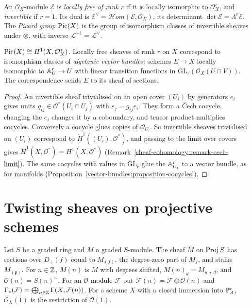 \begin{definition}\label{coherent-sheaves:definition-locally-free}
An $\mathcal{O}_X$-module $\mathcal{E}$ is \emph{locally free of rank $r$} if it is locally isomorphic to $\mathcal{O}_X^r$, and \emph{invertible} if $r = 1$. Its
dual is $\mathcal{E}^\vee = \mathcal{H}om(\mathcal{E}, \mathcal{O}_X)$, its determinant $\det\mathcal{E} = \Lambda^r\mathcal{E}$. The \emph{Picard group} $\operatorname{Pic}(X)$ is
the group of isomorphism classes of invertible sheaves under $\otimes$, with inverse $\mathcal{L}^{-1} = \mathcal{L}^\vee$.
\end{definition}

\begin{proposition}\label{coherent-sheaves:proposition-picard-cech}
$\operatorname{Pic}(X) \cong H^1(X, \mathcal{O}_X^*)$. Locally free sheaves of rank $r$ on $X$ correspond to isomorphism classes of \emph{algebraic vector bundles}: schemes
$E \to X$ locally isomorphic to $\mathbb{A}^r_U \to U$ with linear transition functions in $\mathrm{GL}_r(\mathcal{O}_X(U \cap V))$. The correspondence sends $E$ to its sheaf
of sections.
\end{proposition}

\begin{proof}
An invertible sheaf trivialised on an open cover $(U_i)$ by generators $e_i$ gives units $g_{ij} \in \mathcal{O}^*(U_i \cap U_j)$ with $e_j = g_{ij}e_i$. They form a
\v{C}ech cocycle, changing the $e_i$ changes it by a coboundary, and tensor product multiplies cocycles. Conversely a cocycle glues copies of
$\mathcal{O}_{U_i}$. So invertible sheaves trivialised on $(U_i)$ correspond to $\check H^1((U_i), \mathcal{O}^*)$, and passing to the limit over covers gives
$\check H^1(X, \mathcal{O}^*) = H^1(X, \mathcal{O}^*)$ (Remark~\ref{sheaf-cohomology:remark-cech-limit}). The same cocycles with values in $\mathrm{GL}_r$ glue the
$\mathbb{A}^r_{U_i}$ to a vector bundle, as for manifolds (Proposition~\ref{vector-bundles:proposition-cocycles}).
\end{proof}

\section{Twisting sheaves on projective schemes}\label{coherent-sheaves:section-twisting}

\begin{definition}\label{coherent-sheaves:definition-twisting}
Let $S$ be a graded ring and $M$ a graded $S$-module. The sheaf $\widetilde M$ on $\operatorname{Proj} S$ has sections over $D_+(f)$ equal to $M_{(f)}$, the degree-zero part
of $M_f$, and stalks $M_{(\mathfrak{p})}$. For $n \in \mathbb{Z}$, $M(n)$ is $M$ with degrees shifted, $M(n)_d = M_{n+d}$, and $\mathcal{O}(n) = S(n)^\sim$. For an
$\mathcal{O}$-module $\mathcal{F}$ put $\mathcal{F}(n) = \mathcal{F} \otimes \mathcal{O}(n)$ and $\Gamma_*(\mathcal{F}) = \bigoplus_{n \in \mathbb{Z}}\Gamma(X, \mathcal{F}(n))$.
For a scheme $X$ with a closed immersion into $\mathbb{P}^r_A$, $\mathcal{O}_X(1)$ is the restriction of $\mathcal{O}(1)$.
\end{definition}

